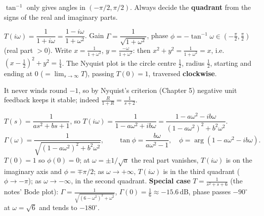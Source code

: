 \begin{warnbox}
$\tan^{-1}$ only gives angles in $(-\pi/2,\pi/2)$. Always decide the \textbf{quadrant} from the signs of the real and imaginary parts.
\end{warnbox}

\begin{workbox}[title={Worked example: first-order lag $T(s)=\dfrac1{s+1}$, with its Nyquist plot}]
$T(i\omega)=\dfrac1{1+i\omega}=\dfrac{1-i\omega}{1+\omega^2}$. Gain $\Gamma=\dfrac1{\sqrt{1+\omega^2}}$, phase $\phi=-\tan^{-1}\omega\in(-\frac\pi2,\frac\pi2)$ (real part $>0$).
Write $x=\frac1{1+\omega^2}$, $y=\frac{-\omega}{1+\omega^2}$: then $x^2+y^2=\frac1{1+\omega^2}=x$, i.e.\ $(x-\frac12)^2+y^2=\frac14$.
The Nyquist plot is the circle centre $\frac12$, radius $\frac12$, starting and ending at $0$ ($=\lim_{s\to\infty}T$), passing $T(0)=1$, traversed \textbf{clockwise}.
\begin{center}
\end{center}
It never winds round $-1$, so by Nyquist's criterion (Chapter 5) negative unit feedback keeps it stable; indeed $\frac{R}{1+R}=\frac{1}{s+2}$.
\end{workbox}

\begin{workbox}[title={Worked example \fr{145--146}: $ay''+by'+y=u$, $a,b>0$}]
$T(s)=\dfrac1{as^2+bs+1}$, so $T(i\omega)=\dfrac{1}{1-a\omega^2+ib\omega}=\dfrac{1-a\omega^2-ib\omega}{(1-a\omega^2)^2+b^2\omega^2}$.
\[\Gamma(\omega)=\frac1{\sqrt{(1-a\omega^2)^2+b^2\omega^2}},\qquad \tan\phi=\frac{b\omega}{a\omega^2-1},\quad\phi=\arg(1-a\omega^2-ib\omega).\]
$T(0)=1$ so $\phi(0)=0$; at $\omega=\pm1/\sqrt a$ the real part vanishes, $T(i\omega)$ is on the imaginary axis and $\phi=\mp\pi/2$;
as $\omega\to+\infty$, $T(i\omega)$ is in the third quadrant ($\phi\to-\pi$); as $\omega\to-\infty$, in the second quadrant.
\textbf{Special case} $T=\frac1{s^2+s+6}$ (the notes' Bode plot): $\Gamma=\frac1{\sqrt{(6-\omega^2)^2+\omega^2}}$, $\Gamma(0)=\frac16\approx-15.6$\,dB, phase passes $-90^\circ$ at $\omega=\sqrt6$ and tends to $-180^\circ$.
\end{workbox}

